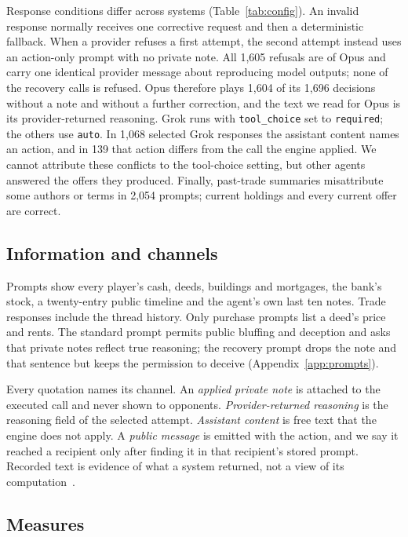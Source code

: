 Response conditions differ across systems (Table~\ref{tab:config}). An invalid response normally receives one corrective request and then a deterministic fallback. When a provider refuses a first attempt, the second attempt instead uses an action-only prompt with no private note. All 1,605 refusals are of Opus and carry one identical provider message about reproducing model outputs; none of the recovery calls is refused. Opus therefore plays 1,604 of its 1,696 decisions without a note and without a further correction, and the text we read for Opus is its provider-returned reasoning. Grok runs with \texttt{tool\_choice} set to \texttt{required}; the others use \texttt{auto}. In 1,068 selected Grok responses the assistant content names an action, and in 139 that action differs from the call the engine applied. We cannot attribute these conflicts to the tool-choice setting, but other agents answered the offers they produced. Finally, past-trade summaries misattribute some authors or terms in 2,054 prompts; current holdings and every current offer are correct.

\subsection{Information and channels}
Prompts show every player's cash, deeds, buildings and mortgages, the bank's stock, a twenty-entry public timeline and the agent's own last ten notes. Trade responses include the thread history. Only purchase prompts list a deed's price and rents. The standard prompt permits public bluffing and deception and asks that private notes reflect true reasoning; the recovery prompt drops the note and that sentence but keeps the permission to deceive (Appendix~\ref{app:prompts}).

Every quotation names its channel. An \emph{applied private note} is attached to the executed call and never shown to opponents. \emph{Provider-returned reasoning} is the reasoning field of the selected attempt. \emph{Assistant content} is free text that the engine does not apply. A \emph{public message} is emitted with the action, and we say it reached a recipient only after finding it in that recipient's stored prompt. Recorded text is evidence of what a system returned, not a view of its computation~\cite{turpin2023unfaithful,lanham2023faithfulness}.

\subsection{Measures}
